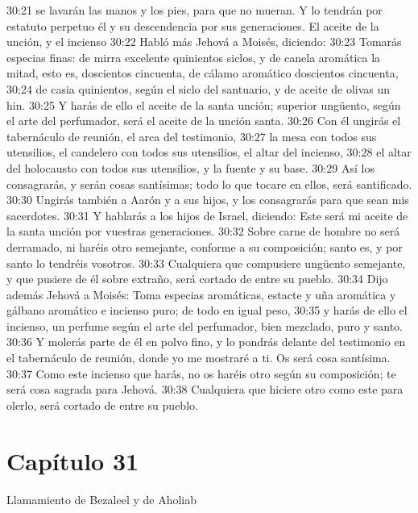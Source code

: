 30:21 se lavarán las manos y los pies, para que no mueran. Y lo tendrán por estatuto perpetuo él y su descendencia por sus generaciones. 
El aceite de la unción, y el incienso 
30:22 Habló más Jehová a Moisés, diciendo: 
30:23 Tomarás especias finas: de mirra excelente quinientos siclos, y de canela aromática la mitad, esto es, doscientos cincuenta, de cálamo aromático doscientos cincuenta, 
30:24 de casia quinientos, según el siclo del santuario, y de aceite de olivas un hin. 
30:25 Y harás de ello el aceite de la santa unción; superior ungüento, según el arte del perfumador, será el aceite de la unción santa. 
30:26 Con él ungirás el tabernáculo de reunión, el arca del testimonio, 
30:27 la mesa con todos sus utensilios, el candelero con todos sus utensilios, el altar del incienso, 
30:28 el altar del holocausto con todos sus utensilios, y la fuente y su base. 
30:29 Así los consagrarás, y serán cosas santísimas; todo lo que tocare en ellos, será santificado. 
30:30 Ungirás también a Aarón y a sus hijos, y los consagrarás para que sean mis sacerdotes. 
30:31 Y hablarás a los hijos de Israel, diciendo: Este será mi aceite de la santa unción por vuestras generaciones. 
30:32 Sobre carne de hombre no será derramado, ni haréis otro semejante, conforme a su composición; santo es, y por santo lo tendréis vosotros. 
30:33 Cualquiera que compusiere ungüento semejante, y que pusiere de él sobre extraño, será cortado de entre su pueblo. 
30:34 Dijo además Jehová a Moisés: Toma especias aromáticas, estacte y uña aromática y gálbano aromático e incienso puro; de todo en igual peso, 
30:35 y harás de ello el incienso, un perfume según el arte del perfumador, bien mezclado, puro y santo. 
30:36 Y molerás parte de él en polvo fino, y lo pondrás delante del testimonio en el tabernáculo de reunión, donde yo me mostraré a ti. Os será cosa santísima. 
30:37 Como este incienso que harás, no os haréis otro según su composición; te será cosa sagrada para Jehová. 
30:38 Cualquiera que hiciere otro como este para olerlo, será cortado de entre su pueblo.  
\section*{Capítulo 31}
Llamamiento de Bezaleel y de Aholiab 


